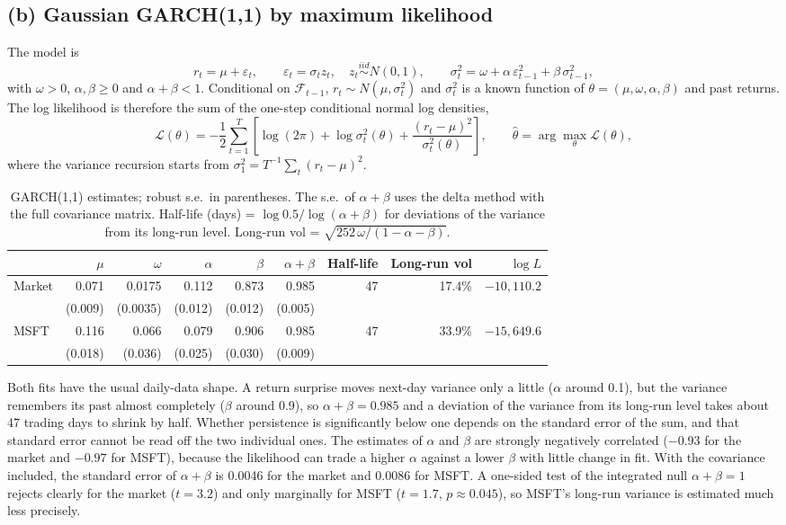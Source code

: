 \documentclass[11pt]{article}
\newcommand{\1}{\mathbf{1}}
\begin{document}
\subsection{(b) Gaussian GARCH(1,1) by maximum likelihood}

The model is
\[
r_t = \mu + \varepsilon_t,\qquad \varepsilon_t=\sigma_t z_t,\quad z_t \overset{iid}{\sim} N(0,1),\qquad
\sigma_t^2 = \omega + \alpha\,\varepsilon_{t-1}^2 + \beta\,\sigma_{t-1}^2,
\]
with $\omega>0$, $\alpha,\beta\ge0$ and $\alpha+\beta<1$. Conditional on $\mathcal F_{t-1}$,
$r_t\sim N(\mu,\sigma_t^2)$ and $\sigma_t^2$ is a known function of $\theta=(\mu,\omega,\alpha,\beta)$
and past returns. The log likelihood is therefore the sum of the one-step conditional
normal log densities,
\[
\mathcal L(\theta) = -\frac12\sum_{t=1}^{T}\left[\log(2\pi)+\log\sigma_t^2(\theta)+\frac{(r_t-\mu)^2}{\sigma_t^2(\theta)}\right],
\qquad \hat\theta=\arg\max_\theta \mathcal L(\theta),
\]
where the variance recursion starts from $\sigma_1^2 = T^{-1}\sum_t(r_t-\mu)^2$.

\begin{table}[!htb]
\centering
\small
\begin{tabular}{lrrrrrrrr}
\toprule
 & $\mu$ & $\omega$ & $\alpha$ & $\beta$ & $\alpha+\beta$ & Half-life & Long-run vol & $\log L$ \\
\midrule
Market & 0.071 & 0.0175 & 0.112 & 0.873 & 0.985 & 47 & 17.4\% & $-10{,}110.2$ \\
       & (0.009) & (0.0035) & (0.012) & (0.012) & (0.005) & & & \\
MSFT   & 0.116 & 0.066 & 0.079 & 0.906 & 0.985 & 47 & 33.9\% & $-15{,}649.6$ \\
       & (0.018) & (0.036) & (0.025) & (0.030) & (0.009) & & & \\
\bottomrule
\end{tabular}
\caption{GARCH(1,1) estimates; robust s.e.\ in parentheses. The s.e.\ of $\alpha+\beta$ uses
the delta method with the full covariance matrix. Half-life (days) = $\log0.5/\log(\alpha+\beta)$
for deviations of the variance from its long-run level. Long-run vol
= $\sqrt{252\,\omega/(1-\alpha-\beta)}$.}
\end{table}

Both fits have the usual daily-data shape. A return surprise moves next-day variance only
a little ($\alpha$ around 0.1), but the variance remembers its past almost completely
($\beta$ around 0.9), so $\alpha+\beta=0.985$ and a deviation of the variance from its
long-run level takes about 47 trading days to shrink by half. Whether persistence is
significantly below one depends on the standard error of the sum, and that standard error
cannot be read off the two individual ones. The estimates of $\alpha$ and $\beta$ are
strongly negatively correlated ($-0.93$ for the market and $-0.97$ for MSFT), because the
likelihood can trade a higher $\alpha$ against a lower $\beta$ with little change in fit. With
the covariance included, the standard error of $\alpha+\beta$ is 0.0046 for the market and
0.0086 for MSFT. A one-sided test of the integrated null $\alpha+\beta=1$ rejects clearly for
the market ($t=3.2$) and only marginally for MSFT ($t=1.7$, $p\approx0.045$), so MSFT's
long-run variance is estimated much less precisely.
\end{document}

